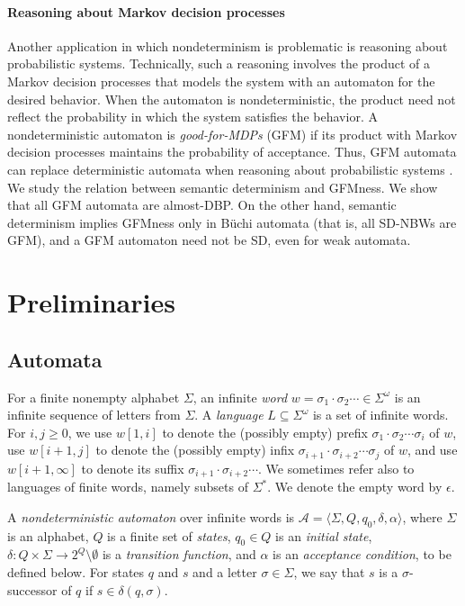 \documentclass[10pt,a4paper]{amsart}
\theoremstyle{definition}
\numberwithin{equation}{section}
\newcommand{\A}{{\mathcal A}}
\begin{document}
\paragraph{Reasoning about Markov decision processes}
Another application in which nondeterminism is problematic is reasoning about probabilistic systems. 
Technically, such a reasoning involves the product of a Markov decision processes that models the system with an automaton for the desired behavior. When the automaton is nondeterministic, the product need not reflect the probability in which the system satisfies the behavior.  A nondeterministic automaton is {\em good-for-MDPs} (GFM) if its product  with Markov decision processes maintains the probability of acceptance. Thus, GFM automata can replace deterministic automata when reasoning about probabilistic systems \cite{HPSSTWW20,STZ22}. 
We study the relation between semantic determinism and GFMness. We show that all GFM automata are almost-DBP. On the other hand, semantic determinism implies GFMness only in B\"uchi automata (that is, all SD-NBWs are GFM), and a GFM automaton need not be SD, even for weak automata. 

\section{Preliminaries}
\label{prelim}


\subsection{Automata}
For a finite nonempty alphabet $\Sigma$, an infinite {\em word\/} $w = \sigma_1 \cdot \sigma_2 \cdots \in \Sigma^\omega$ is an infinite sequence of letters from $\Sigma$. 
A {\em language\/} $L\subseteq \Sigma^\omega$ is a set of infinite words. For $i,j\geq 0$, we use $w[1, i]$ to denote the (possibly empty) prefix $\sigma_1\cdot \sigma_2 \cdots  \sigma_i$ of $w$, use $w[i+1, j]$ to denote the (possibly empty) infix $\sigma_{i+1}\cdot \sigma_{i+2} \cdots \sigma_j$ of $w$, and use $w[i+1, \infty]$ to denote its suffix $\sigma_{i+1} \cdot  \sigma_{i+2} \cdots$. We sometimes refer also to languages of finite words, namely subsets of $\Sigma^*$. We denote the empty word by $\epsilon$.

A \emph{nondeterministic automaton} over infinite words is $\A = \langle \Sigma, Q, q_0, \delta, \alpha  \rangle$, where $\Sigma$ is an alphabet, $Q$ is a finite set of \emph{states}, $q_0\in Q$ is an \emph{initial state}, $\delta: Q\times \Sigma \to 2^Q \setminus \emptyset$ is a \emph{transition function}, and $\alpha$ is an \emph{acceptance condition}, to be defined below. 
For states $q$ and $s$ and a letter $\sigma \in \Sigma$, we say that $s$ is a $\sigma$-successor of $q$ if $s \in \delta(q,\sigma)$.
\end{document}
